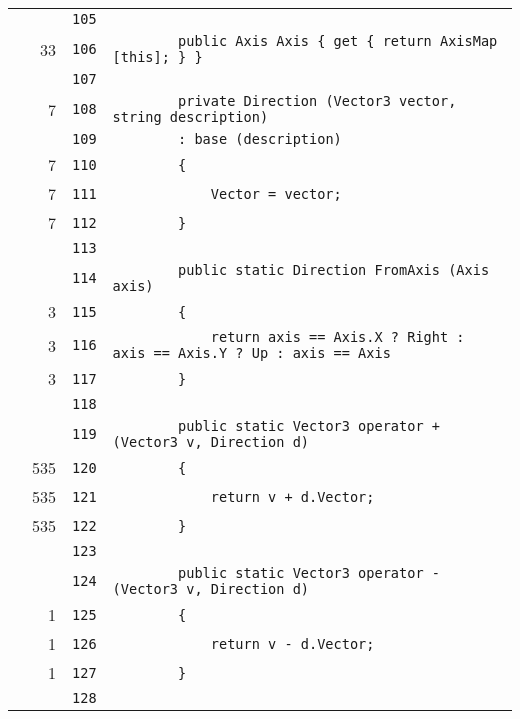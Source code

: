 \documentclass[a4paper,10pt]{article}
\begin{document}
\begin{longtable}[l]{lrrl}
\cellcolor{gray} &  & \verb~105~ & \verb~~\\
\cellcolor{green} & 33 & \verb~106~ & \verb~        public Axis Axis { get { return AxisMap [this]; } }~\\
\cellcolor{gray} &  & \verb~107~ & \verb~~\\
\cellcolor{green} & 7 & \verb~108~ & \verb~        private Direction (Vector3 vector, string description)~\\
\cellcolor{gray} &  & \verb~109~ & \verb~        : base (description)~\\
\cellcolor{green} & 7 & \verb~110~ & \verb~        {~\\
\cellcolor{green} & 7 & \verb~111~ & \verb~            Vector = vector;~\\
\cellcolor{green} & 7 & \verb~112~ & \verb~        }~\\
\cellcolor{gray} &  & \verb~113~ & \verb~~\\
\cellcolor{gray} &  & \verb~114~ & \verb~        public static Direction FromAxis (Axis axis)~\\
\cellcolor{green} & 3 & \verb~115~ & \verb~        {~\\
\cellcolor{green} & 3 & \verb~116~ & \verb~            return axis == Axis.X ? Right : axis == Axis.Y ? Up : axis == Axis~\\
\cellcolor{green} & 3 & \verb~117~ & \verb~        }~\\
\cellcolor{gray} &  & \verb~118~ & \verb~~\\
\cellcolor{gray} &  & \verb~119~ & \verb~        public static Vector3 operator + (Vector3 v, Direction d)~\\
\cellcolor{green} & 535 & \verb~120~ & \verb~        {~\\
\cellcolor{green} & 535 & \verb~121~ & \verb~            return v + d.Vector;~\\
\cellcolor{green} & 535 & \verb~122~ & \verb~        }~\\
\cellcolor{gray} &  & \verb~123~ & \verb~~\\
\cellcolor{gray} &  & \verb~124~ & \verb~        public static Vector3 operator - (Vector3 v, Direction d)~\\
\cellcolor{green} & 1 & \verb~125~ & \verb~        {~\\
\cellcolor{green} & 1 & \verb~126~ & \verb~            return v - d.Vector;~\\
\cellcolor{green} & 1 & \verb~127~ & \verb~        }~\\
\cellcolor{gray} &  & \verb~128~ & \verb~~\\

\end{longtable}
\end{document}
